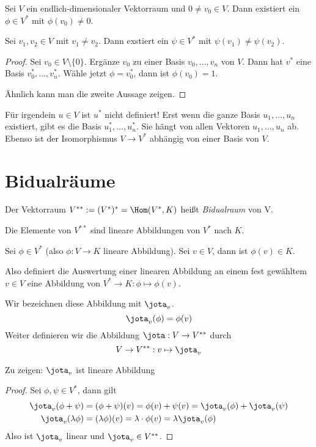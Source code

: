 \documentclass{mycourse}
\begin{document}
\begin{kor} \label{kor: 9.3}
Sei $V$ ein endlich-dimensionaler Vektorraum und $0\neq v_0\in V$.
Dann existiert ein $\phi\in V^*$ mit $\phi(v_0)\neq 0$.

Sei $v_1,v_2\in V$ mit $v_1\neq v_2$. 
Dann exstiert ein $\psi\in V^*$ mit $\psi(v_1)\neq \psi(v_2)$.
\begin{proof}
Sei $v_0\in V \setminus \{0\}$.
Ergänze $v_0$ zu einer Basis $v_0,\dotsc,v_n$ von $V$.
Dann hat $v^*$ eine Basis $v_{0}^*,\dotsc,v_{n}^*$.
Wähle jetzt $\phi=v_0^*$, dann ist $\phi(v_0)=1$.

Ähnlich kann man die zweite Aussage zeigen.
\end{proof}
\end{kor}
\begin{note}
Für irgendein $u\in V$ ist $u^*$ nicht definiert!
Erst wenn die ganze Basis $u_1,\dotsc,u_n$ existiert, gibt es die Basis $u_1^*,\dotsc,u_n^*$.
Sie hängt von allen Vektoren $u_1,\dotsc,u_n$ ab.
Ebenso ist der Isomorphismus $V\to V^*$ abhängig von einer Basis von $V$.
\end{note}

\section{Bidualräume}

\begin{df} \label{df:9.4}
	Der Vektorraum $V^{**} := (V^*)^* = \Hom(V^*,K)$ heißt \emph{Bidualraum} von V.
\end{df}

Die Elemente von $V^{**}$ sind lineare Abbildungen von $V^*$ nach $K$.

Sei $\phi\in V^*$ (also $\phi: V\to K$ lineare Abbildung).
Sei $v\in V$, dann ist $\phi(v)\in K$.

Also definiert die Auswertung einer linearen Abbildung an einem fest gewähltem $v\in V$ eine Abbildung von $V^*\to K: \phi \mapsto \phi(v)$.

Wir bezeichnen diese Abbildung mit $\jota_v$.
\[
	\jota_v(\phi)=\phi(v)
\]
Weiter definieren wir die Abbildung $\jota: V\to V^{**}$ durch
\[
	V\to V^{**}:v\mapsto \jota_v
\]

Zu zeigen: $\jota_v$ ist lineare Abbildung
\begin{proof}
	Sei $\phi,\psi\in V^*$, dann gilt
\begin{align*}
\jota_v(\phi+\psi) &=(\phi+\psi)(v)=\phi(v)+\psi(v)=\jota_v(\phi)+\jota_v(\psi)\\
\jota_v(\lambda\phi) &=(\lambda\phi)(v)=\lambda\cdot\phi(v)=\lambda\jota_v(\phi)
\end{align*}
Also ist $\jota_v$ linear und $\jota_v\in V^{**}$.
\end{proof}
\end{document}
